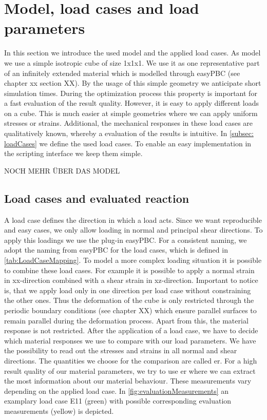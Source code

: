     \section{Model, load cases and load parameters}
    In this section we introduce the used model and the applied load cases. 
    As model we use a simple isotropic cube of size 1x1x1. We use it as one representative part of an infinitely extended material which is modelled through easyPBC (see chapter xx section XX). By the usage of this simple geometry we anticipate short simulation times. During the optimization process this property is important for a fast evaluation of the result quality.  However, it is easy to apply different loads on a cube. This is much easier at simple geometries where we can apply uniform stresses or strains. Additional, the mechanical responses in these load cases are qualitatively known, whereby a evaluation of the results is intuitive.
    In \autoref{subsec: loadCases} we define the used load cases. To enable an easy implementation in the  scripting interface we keep them simple. 
    
    
    NOCH MEHR ÜBER DAS MODEL
    
    \subsection{Load cases and evaluated reaction}\label{subsec: loadCases}
    
    A load case defines the direction in which a load acts. Since we want reproducible and easy cases, we only allow loading in normal and principal shear directions. To apply this loadings we use the  plug-in easyPBC. For a consistent naming, we adopt the naming from easyPBC for the load cases, which is defined in \autoref{tab:LoadCaseMapping}.
     To model a more complex loading situation it is possible to combine these load cases. For example it is possible to apply a normal strain in xx-direction combined with a shear strain in xz-direction. Important to notice is, that we apply load only in one direction per load case without constraining the other ones. Thus the deformation of the cube is only restricted through the periodic boundary conditions (see chapter XX) which ensure parallel surfaces to remain parallel during the deformation process. Apart from this, the material response is not restricted. After the application of a load case, we have to decide which material responses we use to compare with our load parameters. We have the possibility to read out the stresses and strains in all normal and shear directions. The quantities we choose for the comparison are called \acrlong{er}.
     For a high result quality of our material parameters, we try to use \acrlong{er} where we can extract the most information about our material behaviour. These measurements vary depending on the applied load case. In \autoref{fig:evaluationMeasurements} an examplary load case E11 (green) with possible corresponding evaluation measurements (yellow) is depicted.

